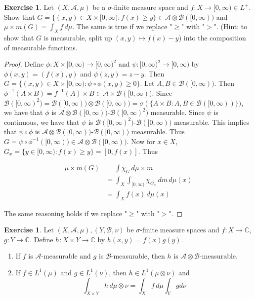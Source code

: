 \documentclass[12pt]{amsart}
\theoremstyle{definition}
\newtheorem{ex}[definition]{Exercise}
\newcommand{\sig}{\sigma}
\newcommand{\C}{\mathbb{C}}
\newcommand{\MA}{\mathcal{A}}
\newcommand{\MB}{\mathcal{B}}
\newcommand{\dm}{\, d m}
\newcommand{\dmu}{\, d \mu}
\newcommand{\Rg}{[0,\infty)}
\newcommand{\lex}[1]{\label{ex:#1}}
\begin{document}
	\begin{ex} \lex{00000} 
		Let $(X, \MA, \mu)$ be a $\sig$-finite measure space and $f:X \rightarrow \Rg \in L^+$. Show that $G = \{(x,y) \in X \times \Rg: f(x) \geq y\} \in \MA \otimes \MB(\Rg)$ and $\mu \times m (G) = \int_X f \dmu$. The same is true if we replace "$\geq$" with "$>$". (Hint: to show that $G$ is measurable, split up $(x,y) \mapsto f(x) - y$) into the composition of measurable functions. 
	\end{ex}
	
	\begin{proof}
		Define $\phi: X \times \Rg \rightarrow \Rg^2$ and $\psi: \Rg^2 \rightarrow \Rg$ by $\phi(x,y) = (f(x),y)$ and $\psi(z,y) = z-y$. Then $G = \{(x,y) \in X \times \Rg: \psi \circ \phi(x,y) \geq 0\}$. Let $A, B \in \MB(\Rg)$. Then $\phi^{-1}(A \times B) = f^{-1}(A) \times B \in \MA \times \MB(\Rg)$. Since $\MB(\Rg^2) = \MB(\Rg) \otimes \MB(\Rg) = \sig(\{A \times B: A, B \in \MB(\Rg)\})$, we have that $\phi$ is $\MA \otimes \MB(\Rg)$-$\MB(\Rg^2)$ measurable. Since $\psi$ is continuous, we have that $\psi$ is $\MB(\Rg^2)$-$\MB(\Rg)$ measurable. This implies that $\psi \circ \phi$ is $\MA \otimes \MB(\Rg)$-$\MB(\Rg)$ measurable. Thus $G = \psi \circ \phi^{-1}(\Rg) \in \MA \otimes \MB(\Rg)$. Now for $x \in X$, $G_x = \{y \in \Rg: f(x) \geq y\} = [0, f(x)]$. Thus 
		
		\begin{align*}
			\mu \times m(G) 
			&= \int \chi_G \dmu \times m\\
			&= \int_X \int_{\Rg} \chi_{G_x} \dm \dmu(x)\\
			&= \int_X f(x) \dmu(x) 
		\end{align*}
		
		The same reasoning holds if we replace "$\geq$" with "$>$".
	\end{proof}
	
	\begin{ex} \lex{00000} 
		Let $(X, \MA, \mu), (Y, \MB, \nu)$ be $\sig$-finite measure spaces and $f:X \rightarrow \C$, $g:Y \rightarrow \C$. Define $h:X \times Y \rightarrow \C$ by $h(x,y) = f(x)g(y)$.
		
		\begin{enumerate}
			\item If $f$ is $\MA$-measurable and $g$ is $\MB$-measurable, then $h$ is $\MA \otimes \MB$-measurable.
			
			\item If $f \in L^1(\mu)$ and $g \in L^1(\nu)$, then $h \in L^1(\mu \otimes \nu)$ and $$\int_{X \times Y}h\dmu \otimes \nu = \int_X f \dmu \int_Y g d\nu$$
		\end{enumerate}
	\end{ex}
	
\end{document}

